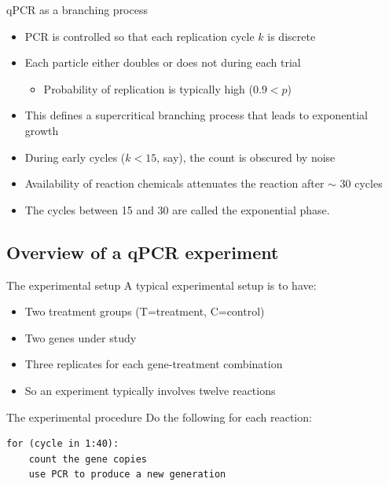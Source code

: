 \documentclass{beamer}
\begin{document}
\begin{frame}{qPCR as a branching process}
  \begin{itemize}
    \item PCR is controlled so that each replication cycle $k$ is discrete
    \item Each particle either doubles or does not during each trial
    \begin{itemize}
      \item Probability of replication is typically high ($0.9 < p$)
    \end{itemize}
    \item This defines a supercritical branching process that leads to exponential growth
    \item During early cycles ($k<15$, say), the count is obscured by noise
    \item Availability of reaction chemicals attenuates the reaction after $\sim$ 30 cycles
    \item The cycles between 15 and 30 are called the exponential phase.
  \end{itemize}
\end{frame}


\subsection{Overview of a qPCR experiment}


\begin{frame}{The experimental setup}
  A typical experimental setup is to have:
  \begin{itemize}
    \item Two treatment groups (T=treatment, C=control)
    \item Two genes under study
    \item Three replicates for each gene-treatment combination
    \item So an experiment typically involves twelve reactions
  \end{itemize}
\end{frame}


\begin{frame}[fragile]{The experimental procedure}
  Do the following for each reaction:
  \begin{lstlisting}
for (cycle in 1:40):
    count the gene copies
    use PCR to produce a new generation
  \end{lstlisting}
\end{frame}
\end{document}
